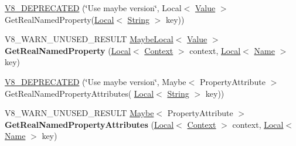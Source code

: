 \begin{DoxyCompactItemize}
\item 
\hyperlink{classv8_1_1_object_a870785c34482a0d284e56db93cd1eb5a}{V8\+\_\+\+D\+E\+P\+R\+E\+C\+A\+T\+ED} (\char`\"{}Use maybe version\char`\"{}, Local$<$ \hyperlink{classv8_1_1_value}{Value} $>$ Get\+Real\+Named\+Property(\hyperlink{classv8_1_1_local}{Local}$<$ \hyperlink{classv8_1_1_string}{String} $>$ key))
\item 
V8\+\_\+\+W\+A\+R\+N\+\_\+\+U\+N\+U\+S\+E\+D\+\_\+\+R\+E\+S\+U\+LT \hyperlink{classv8_1_1_maybe_local}{Maybe\+Local}$<$ \hyperlink{classv8_1_1_value}{Value} $>$ {\bfseries Get\+Real\+Named\+Property} (\hyperlink{classv8_1_1_local}{Local}$<$ \hyperlink{classv8_1_1_context}{Context} $>$ context, \hyperlink{classv8_1_1_local}{Local}$<$ \hyperlink{classv8_1_1_name}{Name} $>$ key)\hypertarget{classv8_1_1_object_aecec39cefb3e394e1696fe618862efec}{}\label{classv8_1_1_object_aecec39cefb3e394e1696fe618862efec}

\item 
\hyperlink{classv8_1_1_object_a9e3a8392408b53d887ea747151e1a823}{V8\+\_\+\+D\+E\+P\+R\+E\+C\+A\+T\+ED} (\char`\"{}Use maybe version\char`\"{}, Maybe$<$ Property\+Attribute $>$ Get\+Real\+Named\+Property\+Attributes(                                                                       \hyperlink{classv8_1_1_local}{Local}$<$ \hyperlink{classv8_1_1_string}{String} $>$ key))
\item 
V8\+\_\+\+W\+A\+R\+N\+\_\+\+U\+N\+U\+S\+E\+D\+\_\+\+R\+E\+S\+U\+LT \hyperlink{classv8_1_1_maybe}{Maybe}$<$ Property\+Attribute $>$ {\bfseries Get\+Real\+Named\+Property\+Attributes} (\hyperlink{classv8_1_1_local}{Local}$<$ \hyperlink{classv8_1_1_context}{Context} $>$ context, \hyperlink{classv8_1_1_local}{Local}$<$ \hyperlink{classv8_1_1_name}{Name} $>$ key)\hypertarget{classv8_1_1_object_a476c21f05ffc519252fad0ab46de33d7}{}\label{classv8_1_1_object_a476c21f05ffc519252fad0ab46de33d7}


\end{DoxyCompactItemize}
